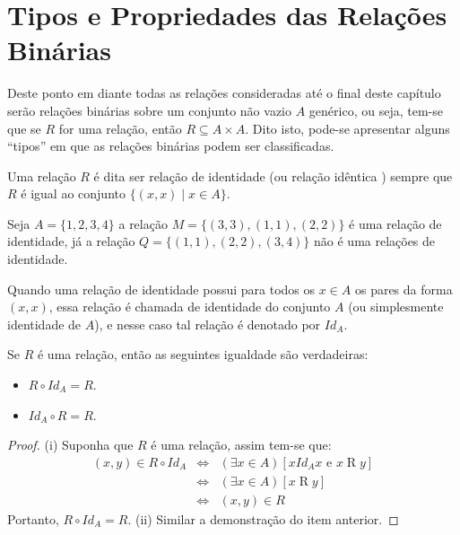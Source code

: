 \section{Tipos e Propriedades das Relações Binárias}

Deste ponto em diante todas as relações consideradas até o final deste capítulo serão relações binárias sobre um conjunto não vazio $A$ genérico, ou seja, tem-se que se $R$ for uma relação, então $R \subseteq A \times A$. Dito isto, pode-se apresentar alguns ``tipos'' em que as relações binárias podem ser classificadas.

\begin{definition}[Identidade]\label{def:RelacaoIdentica}
	Uma relação $R$ é dita ser relação de identidade (ou relação idêntica \cite{abe1991-TC}) sempre que $R$ é igual ao conjunto $\{(x, x) \mid x \in A\}$.
\end{definition}

\begin{exem}
	Seja $A = \{1, 2, 3, 4\}$ a relação $M = \{(3, 3), (1, 1), (2,2)\}$ é uma relação de identidade, já a relação $Q = \{(1, 1), (2,2), (3,4)\}$ não é uma relações de identidade.
\end{exem}

\begin{rema}
	Quando uma relação de identidade possui para todos os $x \in A$  os pares da forma $(x, x)$, essa relação é chamada de identidade do conjunto $A$ (ou simplesmente identidade de $A$), e nesse caso tal relação é denotado por $Id_A$.
\end{rema}

\begin{theorem}\label{teo:NeutralidadeRelacaoIdentidade}
	Se $R$ é uma relação, então as seguintes igualdade são verdadeiras:
	\begin{itemize}
		\item[(i)] $R \circ Id_A = R$.
		\item[(ii)] $Id_A \circ R = R$.
	\end{itemize}
\end{theorem}

\begin{proof}
	(i) Suponha que $R$ é uma relação, assim tem-se que:
	\begin{eqnarray*}
		(x, y) \in R \circ Id_A  & \Longleftrightarrow & (\exists x \in A)[x \mathrel{Id_A} x \text{ e } x \mathrel{R} y]\\
		& \Longleftrightarrow & (\exists x \in A)[x \mathrel{R} y]\\
		& \Longleftrightarrow & (x, y) \in R 
	\end{eqnarray*}
	Portanto,  $R \circ Id_A = R$. (ii) Similar a demonstração do item anterior.
\end{proof}

